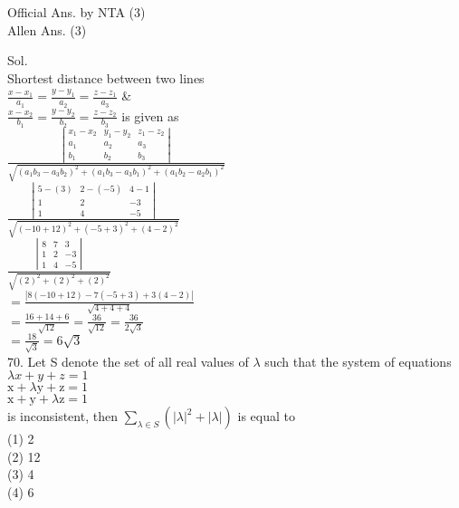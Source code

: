 \documentclass[10pt]{article}
\begin{document}
Official Ans. by NTA (3)\\
Allen Ans. (3)

Sol.\\
Shortest distance between two lines\\
\(\frac{x-x_{1}}{a_{1}}=\frac{y-y_{1}}{a_{2}}=\frac{z-z_{1}}{a_{3}}\) \&\\
\(\frac{x-x_{2}}{b_{1}}=\frac{y-y_{2}}{b_{2}}=\frac{z-z_{2}}{b_{3}}\) is given as\\
\(\frac{\left|\begin{array}{ccc}x_{1}-x_{2} & y_{1}-y_{2} & z_{1}-z_{2} \\ a_{1} & a_{2} & a_{3} \\ b_{1} & b_{2} & b_{3}\end{array}\right|}{\sqrt{\left(a_{1} b_{3}-a_{3} b_{2}\right)^{2}+\left(a_{1} b_{3}-a_{3} b_{1}\right)^{2}+\left(a_{1} b_{2}-a_{2} b_{1}\right)^{2}}}\)\\
\(\frac{\left|\begin{array}{ccc}5-(3) & 2-(-5) & 4-1 \\ 1 & 2 & -3 \\ 1 & 4 & -5\end{array}\right|}{\sqrt{(-10+12)^{2}+(-5+3)^{2}+(4-2)^{2}}}\)\\
\(\frac{\left|\begin{array}{ccc}8 & 7 & 3 \\ 1 & 2 & -3 \\ 1 & 4 & -5\end{array}\right|}{\sqrt{(2)^{2}+(2)^{2}+(2)^{2}}}\)\\
\(=\frac{|8(-10+12)-7(-5+3)+3(4-2)|}{\sqrt{4+4+4}}\)\\
\(=\frac{16+14+6}{\sqrt{12}}=\frac{36}{\sqrt{12}}=\frac{36}{2 \sqrt{3}}\)\\
\(=\frac{18}{\sqrt{3}}=6 \sqrt{3}\)\\
70. Let S denote the set of all real values of \(\lambda\) such that the system of equations\\
\(\lambda x+y+z=1\)\\
\(\mathrm{x}+\lambda \mathrm{y}+\mathrm{z}=1\)\\
\(\mathrm{x}+\mathrm{y}+\lambda \mathrm{z}=1\)\\
is inconsistent, then \(\sum_{\lambda \in S}\left(|\lambda|^{2}+|\lambda|\right)\) is equal to\\
(1) 2\\
(2) 12\\
(3) 4\\
(4) 6
\end{document}
